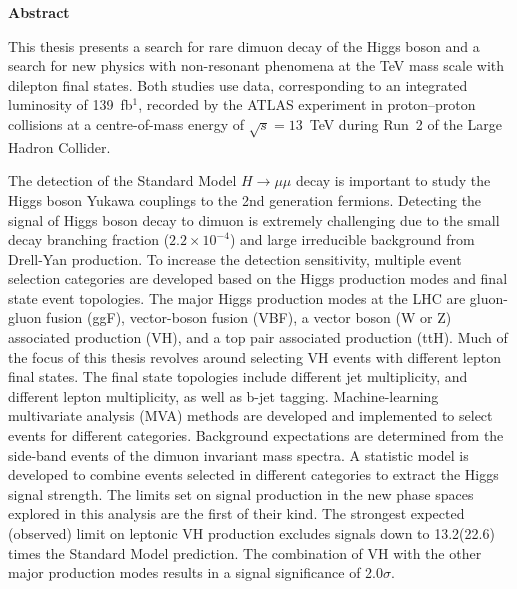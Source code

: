 \begin{center}
\textbf{\LARGE Abstract}
\end{center} 

This thesis presents a search for rare dimuon decay of the Higgs boson and a search for new physics with non-resonant phenomena at the TeV mass scale with dilepton final states.  Both studies use data, corresponding to an integrated luminosity of 139~fb$^{1}$, recorded by the ATLAS experiment in proton--proton collisions at a centre-of-mass energy of $\sqrt{s}=13$~TeV during Run~2 of the Large Hadron Collider.

The detection of the Standard Model $H\to\mu\mu$ decay is important to study the Higgs boson Yukawa couplings to the 2nd generation fermions.
Detecting the signal of Higgs boson decay to dimuon is extremely challenging due to the small decay branching fraction ($2.
2\times10^{-4}$) and large irreducible background from Drell-Yan production.
To increase the detection sensitivity, multiple event selection categories are developed based on the Higgs production modes and final state event topologies.
The major Higgs production modes at the LHC are gluon-gluon fusion (ggF), vector-boson fusion (VBF), a vector boson (W or Z) associated production (VH), and a top pair associated production (ttH).
Much of the focus of this thesis revolves around selecting VH events with different lepton final states.
The final state topologies include different jet multiplicity, and different lepton multiplicity, as well as b-jet tagging.
Machine-learning multivariate analysis (MVA) methods are developed and implemented to select events for different categories.
Background expectations are determined from the side-band events of the dimuon invariant mass spectra.
A statistic model is developed to combine events selected in different categories to extract the Higgs signal strength.
The limits set on signal production in the new phase spaces explored in this analysis are the first of their kind.
The strongest expected (observed) limit on leptonic VH production excludes signals down to 13.2(22.6) times the Standard Model prediction.
The combination of VH with the other major production modes results in a signal significance of 2.0$\sigma$.

